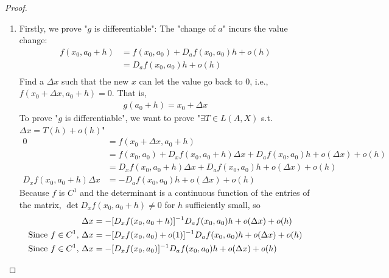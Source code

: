 \documentclass[11pt]{elegantbook}
\begin{document}
\begin{proof}
    \begin{enumerate}
        \item Firstly, we prove "$g$ is differentiable":
        The "change of $a$" incurs the value change:
        \begin{equation}
            \begin{aligned}
                f(x_0,a_0+h)&=f(x_0,a_0)+D_af(x_0,a_0)h+o(h)\\
                &=D_af(x_0,a_0)h+o(h)\\
            \end{aligned}
            \nonumber
        \end{equation}
        Find a $\Delta x$ such that the new $x$ can let the value go back to $0$, i.e., $f(x_0+\Delta x,a_0+h)=0$. That is,
        \begin{equation}
            \begin{aligned}
                g(a_0+h)=x_0+\Delta x
            \end{aligned}
            \nonumber
        \end{equation}
        To prove "$g$ is differentiable", we want to prove "$\exists T\in L(A,X)$ s.t. $\Delta x=T(h)+o(h)$"
        \begin{equation}
            \begin{aligned}
                0&=f(x_0+\Delta x,a_0+h)\\
                &=f(x_0,a_0)+D_xf(x_0,a_0+h)\Delta x+ D_a f(x_0,a_0)h+o(\Delta x)+o(h)\\
                &=D_xf(x_0,a_0+h)\Delta x+ D_a f(x_0,a_0)h+o(\Delta x)+o(h)\\
                D_x f(x_0,a_0+h)\Delta x&=-D_a f(x_0,a_0)h+o(\Delta x)+o(h)
            \end{aligned}
            \nonumber
        \end{equation}
        Because $f$ is $C^1$ and the determinant is a continuous function of the entries of the matrix, $\det D_xf(x_0, a_0 + h) \neq 0$ for $h$ sufficiently small, so
        \begin{equation}
            \begin{aligned}
                \Delta x&= -[D_x f(x_0,a_0+h)]^{-1}D_a f(x_0,a_0)h+o(\Delta x)+o(h)\\
                \textnormal{Since $f\in C^1$, }\Delta x&= -[D_x f(x_0,a_0)+o(1)]^{-1}D_a f(x_0,a_0)h+o(\Delta x)+o(h)\\
                \textnormal{Since $f\in C^1$, }\Delta x&= -[D_x f(x_0,a_0)]^{-1}D_a f(x_0,a_0)h+o(\Delta x)+o(h)

\end{aligned}
\end{equation}
\end{enumerate}
\end{proof}
\end{document}
